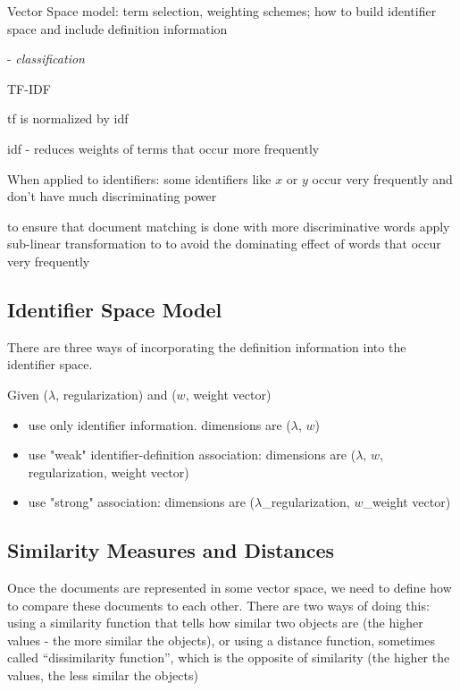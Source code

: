 Vector Space model: term selection, weighting schemes; how to build identifier space and include definition information

\cite{sebastiani2002machine} - \emph{classification}



TF-IDF


tf is normalized by idf

idf - reduces weights of terms that occur more frequently

When applied to identifiers: some identifiers like $x$ or $y$ occur very frequently and don't have much discriminating power


to ensure that document matching is done with more discriminative words
apply sub-linear transformation to to avoid the dominating effect of words that occur very frequently

\subsection{Identifier Space Model} \label{sec:ism}


There are three ways of incorporating the definition information into the identifier space.

Given ($\lambda$, regularization) and ($w$, weight vector)

\begin{itemize}
  \item use only identifier information. dimensions are ($\lambda$, $w$)
  \item use "weak" identifier-definition association:  dimensions are ($\lambda$, $w$, regularization, weight vector)
  \item use "strong" association:  dimensions are ($\lambda$\_regularization, $w$\_weight vector)
\end{itemize}




\subsection{Similarity Measures and Distances}

Once the documents are represented in some vector space, we need to 
define how to compare these documents to each other. There are two 
ways of doing this: using a similarity function that tells how similar 
two objects are (the higher values - the more similar the objects),
or using a distance function, sometimes called ``dissimilarity function'',
which is the opposite of similarity (the higher the values, the less similar 
the objects) 

